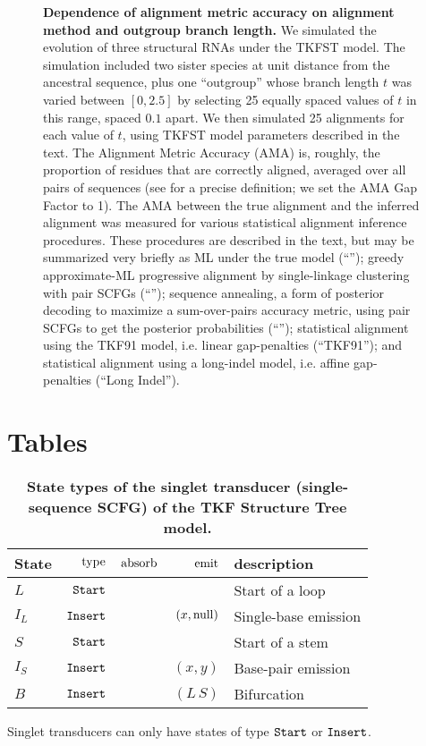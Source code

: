 \documentclass[10pt]{article}
\begin{document}
\begin{figure}[!ht]
  \centering
  \caption{
    \textbf{Dependence of alignment metric accuracy on alignment method and outgroup branch
      length.}
    We simulated the evolution of three structural RNAs under the TKFST model.
    The simulation included two sister species at unit distance from the ancestral sequence, plus one ``outgroup''
    whose branch length $t$ was varied between $[0, 2.5]$ by selecting 25 equally spaced values of $t$ in this range, spaced $0.1$ apart.
    We then simulated 25 alignments for each value of $t$, using TKFST model parameters described in the text.
    The Alignment Metric Accuracy (AMA) is, roughly, the proportion of residues that are correctly
    aligned, averaged over all pairs of sequences
    (see \cite{SchwartzMyersPachter2006} for a precise definition; we set the AMA Gap Factor to 1).
    The AMA between the true alignment and the inferred alignment was measured for various statistical alignment inference procedures.
    These procedures are described in the text, but may be summarized very briefly as
    ML under the true model (``\indiegram'');
    greedy approximate-ML progressive alignment by single-linkage clustering with pair SCFGs (``\stemloc'');
    sequence annealing, a form of posterior decoding to maximize a sum-over-pairs accuracy metric, using pair SCFGs to get the posterior probabilities (``\stemlocama'');
    statistical alignment using the TKF91 model, i.e. linear gap-penalties (``TKF91''); and
    statistical alignment using a long-indel model, i.e. affine gap-penalties (``Long Indel'').
}
\end{figure}


\clearpage
\section*{Tables}

\begin{table}[!ht]
  \caption{
    \textbf{State types of the singlet transducer (single-sequence
      SCFG) of the TKF Structure Tree model.}}
  \begin{tabular}{|l|rrrl|}
    \hline
    State & $\operatorname{type}$ & $\operatorname{absorb}$ & $\operatorname{emit}$ & description \\ \hline
    $L$ & $\mathtt{Start}$ & & & Start of a loop \\ \hline
    $I_L$ & $\mathtt{Insert}$ & & $(x,\mathrm{null})$ & Single-base emission \\ \hline \hline
    $S$ & $\mathtt{Start}$ & & & Start of a stem \\ \hline
    $I_S$ & $\mathtt{Insert}$ & & $(x,y)$ & Base-pair emission \\ \hline \hline
    $B$ & $\mathtt{Insert}$ & & $(L\,S)$ & Bifurcation \\ \hline
  \end{tabular}
  \begin{flushleft}
    Singlet transducers can only have states of type $\mathtt{Start}$ or
    $\mathtt{Insert}$.
  \end{flushleft}
\end{table}
\end{document}
